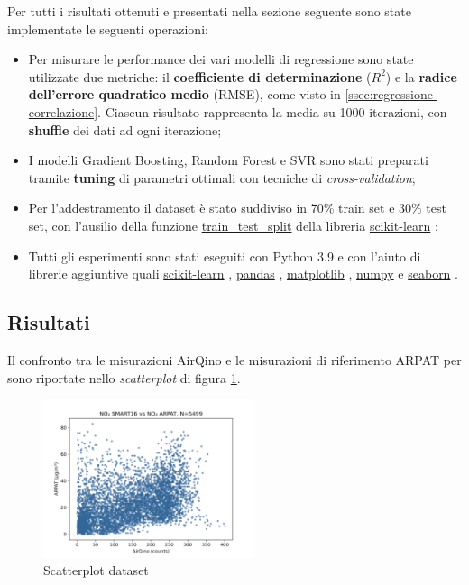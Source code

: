 Per tutti i risultati ottenuti e presentati nella sezione seguente sono state implementate le seguenti operazioni:
\begin{itemize}
  \item Per misurare le performance dei vari modelli di regressione sono state utilizzate due metriche: il \textbf{coefficiente di determinazione} ($R^2$) e la \textbf{radice dell'errore quadratico medio} (RMSE), come visto in \ref{ssec:regressione-correlazione}. Ciascun risultato rappresenta la media su 1000 iterazioni, con \textbf{shuffle} dei dati ad ogni iterazione;
  \item I modelli Gradient Boosting, Random Forest e SVR sono stati preparati tramite \textbf{tuning} di parametri ottimali con tecniche di \textit{cross-validation};
  \item Per l'addestramento il dataset è stato suddiviso in 70\% train set e 30\% test set, con l'ausilio della funzione \url{train_test_split} della libreria \url{scikit-learn} \cite{scikit};
  \item Tutti gli esperimenti sono stati eseguiti con Python 3.9 e con l'aiuto di librerie aggiuntive quali \url{scikit-learn} \cite{scikit}, \url{pandas} \cite{pandas}, \url{matplotlib} \cite{matplotlib}, \url{numpy} \cite{numpy} e \url{seaborn} \cite{seaborn}.
\end{itemize}

\subsection{Risultati }\label{ssec:risultati-no2}

Il confronto tra le misurazioni AirQino e le misurazioni di riferimento ARPAT per  sono riportate nello \textit{scatterplot} di figura \ref{fig:scatterplot_no2}.

\begin{figure}[H]
\centering
\includegraphics[width=0.55\textwidth,height=\textheight,keepaspectratio]{img/sc_no2.png}
\caption{Scatterplot dataset }
\label{fig:scatterplot_no2}
\end{figure}

